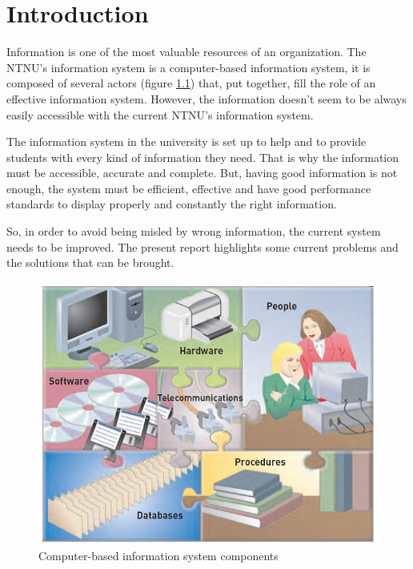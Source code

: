 \chapter{Introduction}

Information is one of the most valuable resources of an organization. The NTNU’s information system is a computer-based information system, it is composed of several actors (figure \ref{fig:infsyscom})  that, put together, fill the role of an effective information system. However, the information doesn’t seem to be always easily accessible with the current NTNU’s information system.

The information system in the university is set up to help and to provide students with every kind of information they need. That is why the information must be accessible, accurate and complete. But, having good information is not enough, the system must be efficient, effective and have good performance standards to display properly and constantly the right information.

So, in order to avoid being misled by wrong information, the current system needs to be improved. The present report highlights some current problems and the solutions that can be brought.

\begin{figure}[H]
	\begin{center}
		\centerline{\includegraphics[scale=0.50]{infsyscom}}
		\caption[Computer-based information system components]{Computer-based information system components}
		\label{fig:infsyscom}
	\end{center}
\end{figure}
